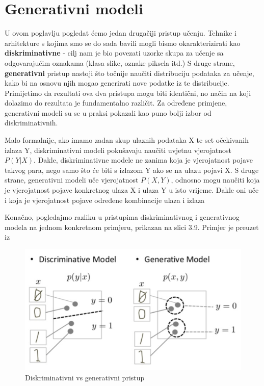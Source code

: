 
\chapter{Generativni modeli}

U ovom poglavlju pogledat ćemo jedan drugačiji pristup učenju. Tehnike i arhitekture s kojima smo se do sada bavili mogli bismo okarakterizirati kao \textbf{diskriminativne} - cilj nam je bio povezati uzorke skupa za učenje sa odgovarajućim oznakama (klasa slike, oznake piksela itd.) S druge strane, \textbf{generativni} pristup nastoji što točnije naučiti distribuciju podataka za učenje, kako bi na osnovu njih mogao generirati nove podatke iz te distribucije. Primijetimo da rezultati ova dva pristupa mogu biti identični, no način na koji dolazimo do rezultata je fundamentalno različit. Za određene primjene, generativni modeli su se u praksi pokazali kao puno bolji izbor od diskriminativnih.

Malo formalnije, ako imamo zadan skup ulaznih podataka X te set očekivanih izlaza Y, diskriminativni modeli pokušavaju naučiti uvjetnu vjerojatnost $P(Y|X)$. Dakle, diskriminativne modele ne zanima koja je vjerojatnost pojave takvog para, nego samo što će biti s izlazom Y ako se na ulazu pojavi X. S druge strane, generativni modeli uče vjerojatnost $P(X,Y)$, odnosno mogu naučiti koja je vjerojatnost pojave konkretnog ulaza X i ulaza Y u isto vrijeme. Dakle oni uče i koja je vjerojatnost pojave određene kombinacije ulaza i izlaza

Konačno, pogledajmo razliku u pristupima diskriminativnog i generativnog modela na jednom konkretnom primjeru, prikazan na slici 3.9. Primjer je preuzet iz \citep{generativeGoogle}

\begin{figure}[htb]
\centering
\includegraphics[width=12cm]{slike/generative_v_discriminative.png}
\caption{Diskriminativni vs generativni pristup \citep{generativeGoogle}}
\label{fig:fer-logo}
\end{figure}
\textbf{}

